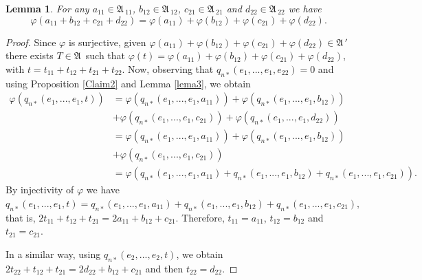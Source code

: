 \documentclass{amsart}
\newtheorem{lemma}{Lemma}[section]
\def\A{{\mathfrak A}\, }
\begin{document}
\begin{lemma}\label{lema4}
For any $a_{11} \in \A_{11}$, $b_{12} \in \A_{12}$, $c_{21} \in \A_{21}$ and $d_{22} \in \A_{22}$ we have 
$$\varphi(a_{11} + b_{12} + c_{21} + d_{22}) = \varphi(a_{11}) + \varphi(b_{12}) + \varphi(c_{21}) + \varphi(d_{22}).$$
\end{lemma}
\begin{proof}
Since $\varphi$ is surjective, given $\varphi(a_{11})+\varphi(b_{12})+\varphi(c_{21})+\varphi(d_{22}) \in \A'$ there exists $T \in \A$ such that 
$\varphi(t) = \varphi(a_{11})+\varphi(b_{12})+\varphi(c_{21})+\varphi(d_{22})$, with $t=t_{11}+t_{12}+t_{21}+t_{22}$. Now, observing that
$q_{n*}(e_1,...,e_1,e_{22})=0$ and using Proposition \ref{Claim2} and Lemma \ref{lema3}, we obtain
$$
\begin{aligned}
\varphi(q_{n*}(e_1,...,e_1,t)) &= \varphi(q_{n*}(e_1,...,e_1,a_{11})) + \varphi(q_{n*}(e_1,...,e_1,b_{12})) \\
&+ \varphi(q_{n*}(e_1,...,e_1,c_{21})) + \varphi(q_{n*}(e_1,...,e_1,d_{22})) \\ 
&= \varphi(q_{n*}(e_1,...,e_1,a_{11})) + \varphi(q_{n*}(e_1,...,e_1,b_{12})) \\
&+ \varphi(q_{n*}(e_1,...,e_1,c_{21})) \\
&= \varphi(q_{n*}(e_1,...,e_1,a_{11}) + q_{n*}(e_1,...,e_1,b_{12}) + q_{n*}(e_1,...,e_1,c_{21})).
\end{aligned}
$$
By injectivity of $\varphi$ we have $q_{n*}(e_1,...,e_1,t) = q_{n*}(e_1,...,e_1,a_{11}) + q_{n*}(e_1,...,e_1,b_{12}) + q_{n*}(e_1,...,e_1,c_{21}),$ that is, $2t_{11} + t_{12} + t_{21} = 2a_{11} + b_{12} + c_{21}.$ Therefore, $t_{11}=a_{11}$, $t_{12}=b_{12}$ and $t_{21}=c_{21}$.

In a similar way, using $q_{n*}(e_2,...,e_2,t)$, we obtain
$2t_{22} + t_{12} + t_{21} = 2d_{22} + b_{12} + c_{21}$ and then $t_{22}=d_{22}$.
\end{proof}

\end{document}
